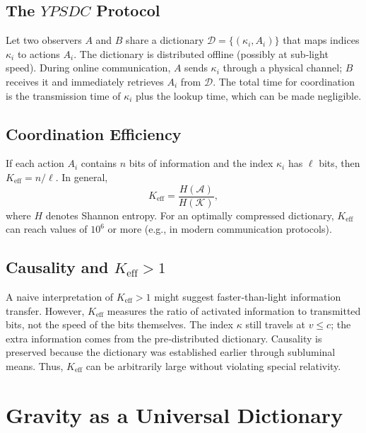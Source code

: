 \documentclass[12pt,a4paper]{article}
\newcommand{\Keff}{K_{\mathrm{eff}}}
\newcommand{\YPSDC}{YPSDC}
\begin{document}
	\subsection{The \(\YPSDC\) Protocol}
	\label{subsec:ypsdc}
	
	Let two observers \(A\) and \(B\) share a dictionary \(\mathcal{D} = \{ (\kappa_i, A_i) \}\) that maps indices \(\kappa_i\) to actions \(A_i\). The dictionary is distributed offline (possibly at sub‑light speed). During online communication, \(A\) sends \(\kappa_i\) through a physical channel; \(B\) receives it and immediately retrieves \(A_i\) from \(\mathcal{D}\). The total time for coordination is the transmission time of \(\kappa_i\) plus the lookup time, which can be made negligible.
	
	\subsection{Coordination Efficiency}
	\label{subsec:keff}
	
	If each action \(A_i\) contains \(n\) bits of information and the index \(\kappa_i\) has \(\ell\) bits, then \(\Keff = n/\ell\). In general,
	\begin{equation}
		\Keff = \frac{H(\mathcal{A})}{H(\mathcal{K})},
	\end{equation}
	where \(H\) denotes Shannon entropy. For an optimally compressed dictionary, \(\Keff\) can reach values of \(10^6\) or more (e.g., in modern communication protocols).
	
	\subsection{Causality and \(K_{\mathrm{eff}} > 1\)}
	\label{subsec:causality}
	
	A naive interpretation of \(\Keff > 1\) might suggest faster‑than‑light information transfer. However, \(\Keff\) measures the ratio of activated information to transmitted bits, not the speed of the bits themselves. The index \(\kappa\) still travels at \(v \le c\); the extra information comes from the pre‑distributed dictionary. Causality is preserved because the dictionary was established earlier through subluminal means. Thus, \(\Keff\) can be arbitrarily large without violating special relativity.
	
	\section{Gravity as a Universal Dictionary}
	\label{sec:gravity}
	
\end{document}

